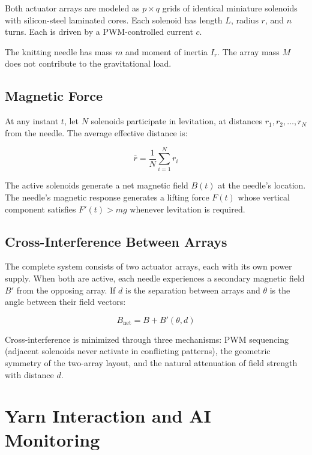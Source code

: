 \documentclass[12pt, a4paper]{article}
\begin{document}
Both actuator arrays are modeled as $p \times q$ grids of identical
miniature solenoids with silicon-steel laminated cores. Each solenoid
has length $L$, radius $r$, and $n$ turns. Each is driven by a
PWM-controlled current $c$.

The knitting needle has mass $m$ and moment of inertia $I_r$. The
array mass $M$ does not contribute to the gravitational load.

\subsection{Magnetic Force}

At any instant $t$, let $N$ solenoids participate in levitation, at
distances $r_1, r_2, \ldots, r_N$ from the needle. The average
effective distance is:

\begin{equation}
\bar{r} = \frac{1}{N} \sum_{i=1}^{N} r_i
\end{equation}

The active solenoids generate a net magnetic field $B(t)$ at the
needle's location. The needle's magnetic response generates a lifting
force $F(t)$ whose vertical component satisfies $F'(t) > mg$ whenever
levitation is required.

\subsection{Cross-Interference Between Arrays}

The complete system consists of two actuator arrays, each with its own
power supply. When both are active, each needle experiences a secondary
magnetic field $B'$ from the opposing array. If $d$ is the separation
between arrays and $\theta$ is the angle between their field vectors:

\begin{equation}
B_{\text{net}} = B + B'(\theta, d)
\end{equation}

Cross-interference is minimized through three mechanisms: PWM sequencing
(adjacent solenoids never activate in conflicting patterns), the
geometric symmetry of the two-array layout, and the natural attenuation
of field strength with distance $d$.

\section{Yarn Interaction and AI Monitoring}
\end{document}
